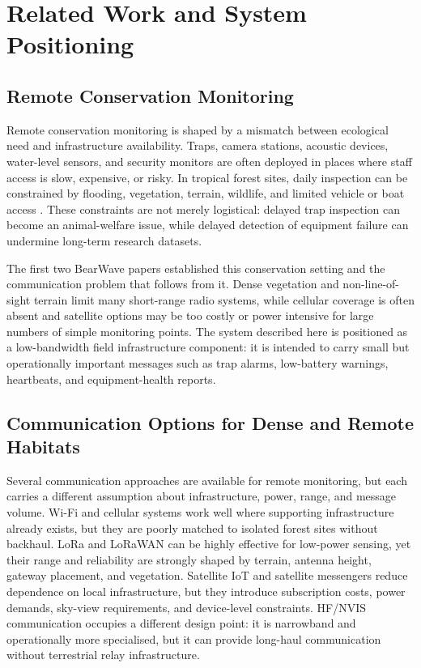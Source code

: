 \documentclass[acmsmall,screen]{acmart}
\begin{document}
\section{Related Work and System Positioning}
\subsection{Remote Conservation Monitoring}
Remote conservation monitoring is shaped by a mismatch between ecological need and infrastructure availability. Traps, camera stations, acoustic devices, water-level sensors, and security monitors are often deployed in places where staff access is slow, expensive, or risky. In tropical forest sites, daily inspection can be constrained by flooding, vegetation, terrain, wildlife, and limited vehicle or boat access \cite{ButterworthMarkAndrew2025ERCi}. These constraints are not merely logistical: delayed trap inspection can become an animal-welfare issue, while delayed detection of equipment failure can undermine long-term research datasets.

The first two BearWave papers established this conservation setting and the communication problem that follows from it. Dense vegetation and non-line-of-sight terrain limit many short-range radio systems, while cellular coverage is often absent and satellite options may be too costly or power intensive for large numbers of simple monitoring points. The system described here is positioned as a low-bandwidth field infrastructure component: it is intended to carry small but operationally important messages such as trap alarms, low-battery warnings, heartbeats, and equipment-health reports.

\subsection{Communication Options for Dense and Remote Habitats}
Several communication approaches are available for remote monitoring, but each carries a different assumption about infrastructure, power, range, and message volume. Wi-Fi and cellular systems work well where supporting infrastructure already exists, but they are poorly matched to isolated forest sites without backhaul. LoRa and LoRaWAN can be highly effective for low-power sensing, yet their range and reliability are strongly shaped by terrain, antenna height, gateway placement, and vegetation. Satellite IoT and satellite messengers reduce dependence on local infrastructure, but they introduce subscription costs, power demands, sky-view requirements, and device-level constraints. HF/NVIS communication occupies a different design point: it is narrowband and operationally more specialised, but it can provide long-haul communication without terrestrial relay infrastructure.
\end{document}
